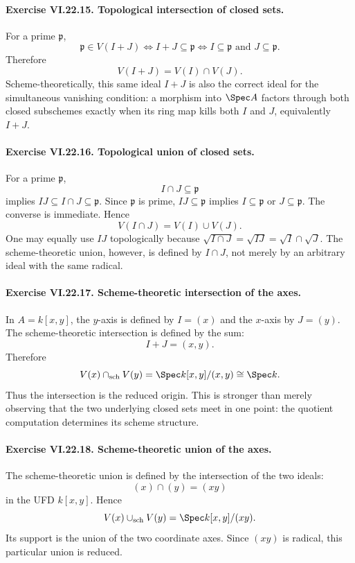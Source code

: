 \paragraph{Exercise VI.22.15. Topological intersection of closed sets.}
\begin{solution}
For a prime $\mathfrak p$,
\[
 \mathfrak p\in V(I+J)
 \iff I+J\subseteq\mathfrak p
 \iff I\subseteq\mathfrak p\text{ and }J\subseteq\mathfrak p.
\]
Therefore
\[
 V(I+J)=V(I)\cap V(J).
\]
Scheme-theoretically, this same ideal $I+J$ is also the correct ideal for the simultaneous
vanishing condition: a morphism into $\Spec A$ factors through both closed subschemes exactly
when its ring map kills both $I$ and $J$, equivalently $I+J$.
\end{solution}

\paragraph{Exercise VI.22.16. Topological union of closed sets.}
\begin{solution}
For a prime $\mathfrak p$,
\[
 I\cap J\subseteq\mathfrak p
\]
implies $IJ\subseteq I\cap J\subseteq\mathfrak p$.  Since $\mathfrak p$ is prime,
$IJ\subseteq\mathfrak p$ implies $I\subseteq\mathfrak p$ or $J\subseteq\mathfrak p$.
The converse is immediate.  Hence
\[
 V(I\cap J)=V(I)\cup V(J).
\]
One may equally use $IJ$ topologically because
$\sqrt{I\cap J}=\sqrt{IJ}=\sqrt I\cap\sqrt J$.  The scheme-theoretic union, however, is
defined by $I\cap J$, not merely by an arbitrary ideal with the same radical.
\end{solution}

\paragraph{Exercise VI.22.17. Scheme-theoretic intersection of the axes.}
\begin{solution}
In $A=k[x,y]$, the $y$-axis is defined by $I=(x)$ and the $x$-axis by $J=(y)$.
The scheme-theoretic intersection is defined by the sum:
\[
 I+J=(x,y).
\]
Therefore
\[
 V(x)\cap_{\mathrm{sch}}V(y)
 =\Spec k[x,y]/(x,y)
 \cong\Spec k.
\]
Thus the intersection is the reduced origin.  This is stronger than merely observing that the
two underlying closed sets meet in one point: the quotient computation determines its scheme
structure.
\end{solution}

\paragraph{Exercise VI.22.18. Scheme-theoretic union of the axes.}
\begin{solution}
The scheme-theoretic union is defined by the intersection of the two ideals:
\[
 (x)\cap(y)=(xy)
\]
in the UFD $k[x,y]$.  Hence
\[
 V(x)\cup_{\mathrm{sch}}V(y)
 =\Spec k[x,y]/(xy).
\]
Its support is the union of the two coordinate axes.  Since $(xy)$ is radical, this particular
union is reduced.
\end{solution}

